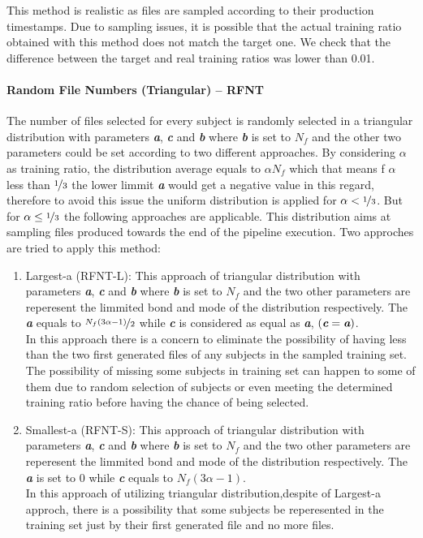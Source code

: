 \documentclass[10pt, conference, compsocconf]{IEEEtran}
\begin{document}
This method is realistic as files are sampled according to their production timestamps.
Due to sampling issues, it is possible that the actual training ratio obtained with this method
does not match the target one. We check that the difference between the target and real training ratios
was lower than 0.01.\\ 

\paragraph{Random File Numbers (Triangular) -- RFNT}
The number of files selected for every subject is randomly selected in
a triangular distribution with parameters \textit{\textbf{a}}, \textit{\textbf{c}} and \textit{\textbf{b}} where \textit{\textbf{b}} is set to $N_{f}$ and the other two parameters could be set according to two different approaches. By considering $\alpha$ as training ratio, the distribution average equals to $\alpha N_{f}$ which that means f  $\alpha$ less than $\nicefrac{1}{3}$ the lower limmit \textit{\textbf{a}} would get a negative value in this regard, therefore to avoid this issue the uniform distribution is applied for $\alpha < \nicefrac{1}{3}$. But for $\alpha \leq \nicefrac{1}{3}$ the following approaches are applicable. This distribution aims at sampling files produced towards the end of the pipeline execution.
Two approches are tried to apply this method:
\begin{enumerate}
\item Largest-a (RFNT-L):  
 This approach of triangular distribution with parameters \textit{\textbf{a}}, \textit{\textbf{c}} and \textit{\textbf{b}} where \textit{\textbf{b}} is set to $N_{f}$ and the two other parameters are reperesent the limmited bond and mode of the distribution respectively. The \textit{\textbf{a}} equals to $\nicefrac {N_{f}(3\alpha-1)}{2}$ while \textit{\textbf{c}} is considered as equal as \textit{\textbf{a}}, $(\textit{\textbf{c}} = \textit{\textbf{a}})$.\\

In this approach there is a concern to eliminate the possibility of having less 
than the two first generated files of any subjects in the sampled training set. 
The possibility of missing some subjects in training set can happen to some of them due to 
random selection of subjects or even meeting the determined training ratio before 
having the chance of being selected.

\item Smallest-a (RFNT-S):
This approach of triangular distribution with parameters \textit{\textbf{a}}, \textit{\textbf{c}} and \textit{\textbf{b}} where \textit{\textbf{b}} is set to $N_{f}$ and the
 two other parameters are reperesent the limmited bond and mode of the distribution respectively. The \textit{\textbf{a}} is set to $0$  while \textit{\textbf{c}} equals to $N_{f}(3\alpha-1)$.\\
In this approach of utilizing triangular distribution,despite of Largest-a approch, there is a possibility 
that some subjects be reperesented in the training set just by their first generated file and no more files.

\end{enumerate}
\end{document}
